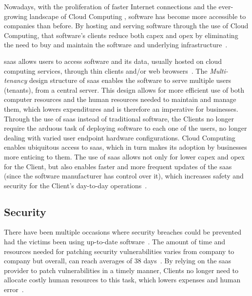 Nowadays, with the proliferation of faster Internet connections and the ever-growing landscape of Cloud Computing
\Parencite{dillon_tharam_and_wu_chen_and_chang_elizabeth}, software has become more accessible to companies than before.
By hosting and serving software through the use of Cloud Computing, that software's clients reduce both \gls{capex} and \gls{opex} by eliminating the need to buy and maintain the software and underlying infrastructure~\Parencite{alnumay_2020}.

\gls{saas} allows users to access software and its data, usually hosted on cloud computing services, through thin clients and/or web browsers~\Parencites{mell_grance_2011}{Ali_Abdulrazzaq_and_Md_Sultan_Abu_Bakar_and_abdul_ghani_Abdul_azim_and_Zulzalil_Hazura}. The \textit{Multi-tenancy} design structure of \gls{saas} enables the software to serve multiple users (tenants), from a central server. This design allows for more efficient use of both computer resources and the human resources needed to maintain and manage them, which lowers expenditures and is therefore an imperative for businesses. Through the use of \gls{saas} instead of traditional software, the Clients no longer require the arduous task of deploying software to each one of the users, no longer dealing with varied user endpoint hardware configurations.
Cloud Computing enables ubiquitous access to \gls{saas}, which in turn makes its adoption by businesses more enticing to them. The use of \gls{saas} allows not only for lower \gls{capex} and \gls{opex} for the Client, but also enables faster and more frequent updates of the \gls{saas} (since the software manufacturer has control over it), which increases safety and security for the Client's day-to-day operations~\Parencite{cavusoglu_cavusoglu_zhang_2008}. 

\subsection{Security}\label{state-of-the-art:ss:security}

There have been multiple occasions where security breaches could be prevented had the victims been using up-to-date software~\Parencite{glenn_2018}. The amount of time and resources needed for patching security vulnerabilities varies from company to company but overall, can reach averages of 38 days~\Parencite{rapid7_2018}. By relying on the \gls{saas} provider to patch vulnerabilities in a timely manner, Clients no longer need to allocate costly human resources to this task, which lowers expenses and human error~\Parencite{glenn_2018}. 


